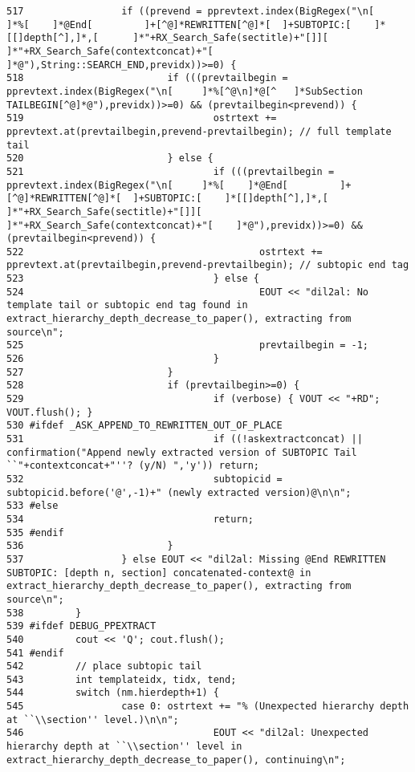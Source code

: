 \begin{verbatim}
517                 if ((prevend = pprevtext.index(BigRegex("\n[    ]*%[    ]*@End[         ]+[^@]*REWRITTEN[^@]*[  ]+SUBTOPIC:[    ]*[[]depth[^],]*,[      ]*"+RX_Search_Safe(sectitle)+"[]][      ]*"+RX_Search_Safe(contextconcat)+"[    ]*@"),String::SEARCH_END,previdx))>=0) {
518                         if (((prevtailbegin = pprevtext.index(BigRegex("\n[     ]*%[^@\n]*@[^   ]*SubSection TAILBEGIN[^@]*@"),previdx))>=0) && (prevtailbegin<prevend)) {
519                                 ostrtext += pprevtext.at(prevtailbegin,prevend-prevtailbegin); // full template tail
520                         } else {
521                                 if (((prevtailbegin = pprevtext.index(BigRegex("\n[     ]*%[    ]*@End[         ]+[^@]*REWRITTEN[^@]*[  ]+SUBTOPIC:[    ]*[[]depth[^],]*,[      ]*"+RX_Search_Safe(sectitle)+"[]][      ]*"+RX_Search_Safe(contextconcat)+"[    ]*@"),previdx))>=0) && (prevtailbegin<prevend)) {
522                                         ostrtext += pprevtext.at(prevtailbegin,prevend-prevtailbegin); // subtopic end tag
523                                 } else {
524                                         EOUT << "dil2al: No template tail or subtopic end tag found in extract_hierarchy_depth_decrease_to_paper(), extracting from source\n";
525                                         prevtailbegin = -1;
526                                 }
527                         }
528                         if (prevtailbegin>=0) {
529                                 if (verbose) { VOUT << "+RD"; VOUT.flush(); }
530 #ifdef _ASK_APPEND_TO_REWRITTEN_OUT_OF_PLACE
531                                 if ((!askextractconcat) || confirmation("Append newly extracted version of SUBTOPIC Tail ``"+contextconcat+"''? (y/N) ",'y')) return;
532                                 subtopicid = subtopicid.before('@',-1)+" (newly extracted version)@\n\n";
533 #else
534                                 return;
535 #endif
536                         }
537                 } else EOUT << "dil2al: Missing @End REWRITTEN SUBTOPIC: [depth n, section] concatenated-context@ in extract_hierarchy_depth_decrease_to_paper(), extracting from source\n";
538         }
539 #ifdef DEBUG_PPEXTRACT
540         cout << 'Q'; cout.flush();
541 #endif
542         // place subtopic tail
543         int templateidx, tidx, tend;
544         switch (nm.hierdepth+1) {
545                 case 0: ostrtext += "% (Unexpected hierarchy depth at ``\\section'' level.)\n\n";
546                                 EOUT << "dil2al: Unexpected hierarchy depth at ``\\section'' level in extract_hierarchy_depth_decrease_to_paper(), continuing\n";

\end{verbatim}
